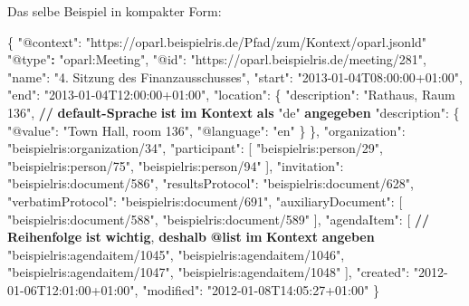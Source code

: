 \documentclass[,a4paper]{article}
\newenvironment{Shaded}{}{}
\newcommand{\DataTypeTok}[1]{\textcolor[rgb]{0.56,0.13,0.00}{{#1}}}
\newcommand{\StringTok}[1]{\textcolor[rgb]{0.25,0.44,0.63}{{#1}}}
\newcommand{\ErrorTok}[1]{\textcolor[rgb]{1.00,0.00,0.00}{\textbf{{#1}}}}
\newcommand{\NormalTok}[1]{{#1}}
\begin{document}
Das selbe Beispiel in kompakter Form:

\begin{Shaded}
\begin{Highlighting}[]
\NormalTok{\{}
    \DataTypeTok{"@context"}\NormalTok{: }\StringTok{"https://oparl.beispielris.de/Pfad/zum/Kontext/oparl.jsonld"}
    \StringTok{"@type"}\ErrorTok{:} \StringTok{"oparl:Meeting"}\NormalTok{,}
    \DataTypeTok{"@id"}\NormalTok{: }\StringTok{"https://oparl.beispielris.de/meeting/281"}\NormalTok{,}
    \DataTypeTok{"name"}\NormalTok{: }\StringTok{"4. Sitzung des Finanzausschusses"}\NormalTok{,}
    \DataTypeTok{"start"}\NormalTok{: }\StringTok{"2013-01-04T08:00:00+01:00"}\NormalTok{,}
    \DataTypeTok{"end"}\NormalTok{: }\StringTok{"2013-01-04T12:00:00+01:00"}\NormalTok{,}
    \DataTypeTok{"location"}\NormalTok{: \{}
        \DataTypeTok{"description"}\NormalTok{: }\StringTok{"Rathaus, Raum 136"}\NormalTok{, }\ErrorTok{//} \ErrorTok{default-Sprache} \ErrorTok{ist} \ErrorTok{im} \ErrorTok{Kontext} \ErrorTok{als} \DataTypeTok{"de"} \ErrorTok{angegeben}
        \DataTypeTok{"description"}\NormalTok{: \{}
            \DataTypeTok{"@value"}\NormalTok{: }\StringTok{"Town Hall, room 136"}\NormalTok{,}
            \DataTypeTok{"@language"}\NormalTok{: }\StringTok{"en"}
        \NormalTok{\}}
    \NormalTok{\},}
    \DataTypeTok{"organization"}\NormalTok{: }\StringTok{"beispielris:organization/34"}\NormalTok{,}
    \DataTypeTok{"participant"}\NormalTok{: [}
        \StringTok{"beispielris:person/29"}\NormalTok{,}
        \StringTok{"beispielris:person/75"}\NormalTok{,}
        \StringTok{"beispielris:person/94"}
    \NormalTok{],}
    \DataTypeTok{"invitation"}\NormalTok{: }\StringTok{"beispielris:document/586"}\NormalTok{,}
    \DataTypeTok{"resultsProtocol"}\NormalTok{: }\StringTok{"beispielris:document/628"}\NormalTok{,}
    \DataTypeTok{"verbatimProtocol"}\NormalTok{: }\StringTok{"beispielris:document/691"}\NormalTok{,}
    \DataTypeTok{"auxiliaryDocument"}\NormalTok{: [}
        \StringTok{"beispielris:document/588"}\NormalTok{,}
        \StringTok{"beispielris:document/589"}
    \NormalTok{],}
    \DataTypeTok{"agendaItem"}\NormalTok{: [}
    \ErrorTok{//} \ErrorTok{Reihenfolge} \ErrorTok{ist} \ErrorTok{wichtig}\NormalTok{, }\ErrorTok{deshalb} \ErrorTok{@list} \ErrorTok{im} \ErrorTok{Kontext} \ErrorTok{angeben}
        \StringTok{"beispielris:agendaitem/1045"}\NormalTok{,}
        \StringTok{"beispielris:agendaitem/1046"}\NormalTok{,}
        \StringTok{"beispielris:agendaitem/1047"}\NormalTok{,}
        \StringTok{"beispielris:agendaitem/1048"}
    \NormalTok{],}
    \DataTypeTok{"created"}\NormalTok{: }\StringTok{"2012-01-06T12:01:00+01:00"}\NormalTok{,}
    \DataTypeTok{"modified"}\NormalTok{: }\StringTok{"2012-01-08T14:05:27+01:00"}
\NormalTok{\}}
\end{Highlighting}
\end{Shaded}
\end{document}
